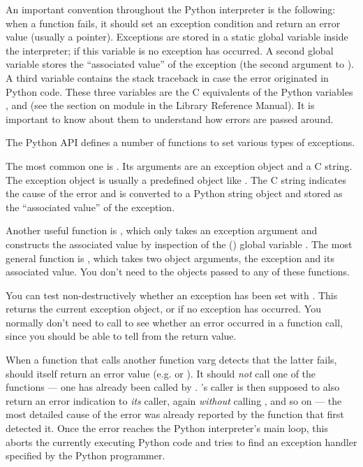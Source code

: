 An important convention throughout the Python interpreter is the
following: when a function fails, it should set an exception condition
and return an error value (usually a  pointer).  Exceptions
are stored in a static global variable inside the interpreter; if this
variable is  no exception has occurred.  A second global
variable stores the ``associated value'' of the exception (the second
argument to ).  A third variable contains the stack
traceback in case the error originated in Python code.  These three
variables are the C equivalents of the Python variables
,  and 
(see the section on module  in the Library Reference
Manual).  It is important to know about them to understand how errors
are passed around.

The Python API defines a number of functions to set various types of
exceptions.

The most common one is .  Its arguments are an
exception object and a C string.  The exception object is usually a
predefined object like .  The C string
indicates the cause of the error and is converted to a Python string
object and stored as the ``associated value'' of the exception.

Another useful function is , which only
takes an exception argument and constructs the associated value by
inspection of the (\UNIX{}) global variable .  The most
general function is , which takes two object
arguments, the exception and its associated value.  You don't need to
 the objects passed to any of these functions.

You can test non-destructively whether an exception has been set with
.  This returns the current exception object,
or  if no exception has occurred.  You normally don't need
to call  to see whether an error occurred in a
function call, since you should be able to tell from the return value.

When a function  that calls another function var{g} detects
that the latter fails,  should itself return an error value
(e.g.  or ).  It should \emph{not} call one of the
 functions --- one has already been called by .
's caller is then supposed to also return an error indication
to \emph{its} caller, again \emph{without} calling ,
and so on --- the most detailed cause of the error was already
reported by the function that first detected it.  Once the error
reaches the Python interpreter's main loop, this aborts the currently
executing Python code and tries to find an exception handler specified
by the Python programmer.

